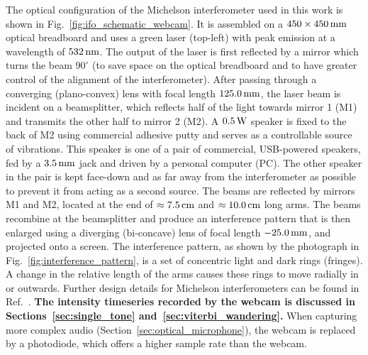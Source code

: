 \documentclass[paper-main.tex]{subfiles}
\begin{document}
The optical configuration of the Michelson interferometer used in this work is shown in Fig.~\ref{fig:ifo_schematic_webcam}.
It is assembled on a $450 \times 450 \,{\rm mm} $ optical breadboard and uses a green laser (top-left) with peak emission at a wavelength of $532\,{\rm nm}$.
The output of the laser is first reflected by a mirror which turns the beam $90^{\circ}$ (to save space on the optical breadboard and to have greater control of the alignment of the interferometer).
After passing through a converging (plano-convex) lens with focal length $125.0\,{\rm mm}$, the laser beam is incident on a beamsplitter, which reflects half of the light towards mirror 1 (M1) and transmits the other half to mirror 2 (M2). 
A $0.5\,{\rm W}$ speaker is fixed to the back of M2 using commercial adhesive putty and serves as a controllable source of vibrations. 
This speaker is one of a pair of commercial, USB-powered speakers, fed by a $3.5\,{\rm mm}$ jack and driven by a personal computer (PC). 
The other speaker in the pair is kept face-down and as far away from the interferometer as possible to prevent it from acting as a second source.
The beams are reflected by mirrors M1 and M2, located at the end of $\approx 7.5\,{\rm cm}$ and $\approx 10.0\,{\rm cm}$ long arms.
The beams recombine at the beamsplitter and produce an interference pattern that is then enlarged using a diverging (bi-concave) lens of focal length $-25.0\,{\rm mm}$, and projected onto a screen.
The interference pattern, as shown by the photograph in Fig.~\ref{fig:interference_pattern}, is a set of concentric light and dark rings (fringes). 
A change in the relative length of the arms causes these rings to move radially in or outwards.
Further design details for Michelson interferometers can be found in Ref.~\cite{TTExhibit:2020}.
\textbf{The intensity timeseries recorded by the webcam is discussed in Sections~\ref{sec:single_tone} and~\ref{sec:viterbi_wandering}.}
When capturing more complex audio (Section~\ref{sec:optical_microphone}), the webcam is replaced by a photodiode, which offers a higher sample rate than the webcam. 
\end{document}
